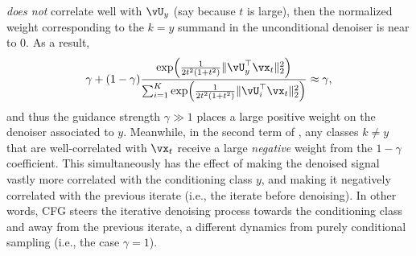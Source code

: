 \documentclass[../../book-main.tex]{subfiles}
\begin{document}
\begin{example}
\begin{enumerate}
      \textit{does not} correlate well with $\vU_y$ (say because $t$ is large),
      then the normalized weight corresponding to the $k=y$ summand in the
      unconditional denoiser is near to $0$. As a result, 
      \begin{equation}
        \gamma + (1 - \gamma) 
      \frac{\exp\rp{\frac{1}{2t^{2}(1
      + t^{2})}\norm{\vU_{y}^{\top}\vx_t}_{2}^{2}}}{\sum_{i
      = 1}^{K}\exp\rp{\frac{1}{2t^{2}(1
      + t^{2})}\norm{\vU_{i}^{\top}\vx_t}_{2}^{2}}}
        \approx \gamma,
      \end{equation}
      and thus the guidance strength $\gamma \gg 1$ places a large positive
      weight on the denoiser associated to $y$.
      Meanwhile, in the second term of ,
      any classes $k \neq y$ that are well-correlated with $\vx_t$ 
      receive a large \textit{negative} weight from the $1 - \gamma$
      coefficient.
      This simultaneously has the effect of making the denoised signal vastly
      more correlated with the conditioning class $y$, and making it negatively
      correlated with the previous iterate (i.e., the iterate before denoising).
      In other words, CFG steers the iterative denoising process towards the
      conditioning class and away from the previous iterate, a different
      dynamics from purely conditional sampling (i.e., the case $\gamma = 1$).
  \end{enumerate}


\end{example}
\end{document}
